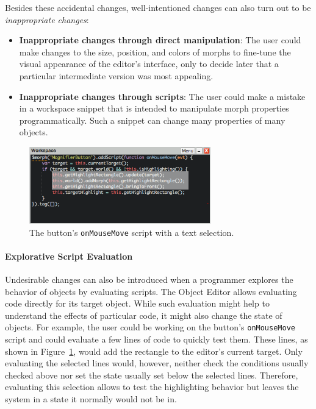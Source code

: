 Besides these accidental changes, well-intentioned changes can also turn out to be \emph{inappropriate changes}:

\begin{itemize}
    \item \textbf{Inappropriate changes through direct manipulation}: The user could make changes to the size, position, and colors of morphs to fine-tune the visual appearance of the editor's interface, only to decide later that a particular intermediate version was most appealing.
    \item \textbf{Inappropriate changes through scripts}: The user could make a mistake in a workspace snippet that is intended to manipulate morph properties programmatically. Such a snippet can change many properties of many objects.
\end{itemize}

\begin{figure}[h]
    \centering
    \includegraphics[width=0.7\textwidth]{figures/3_motivation/4_workspaceDoIt.png}
    \caption{The button's \lstinline{onMouseMove} script with a text selection.}
    \label{fig:onMouseOverScript}
\end{figure}

\paragraph{Explorative Script Evaluation}
Undesirable changes can also be introduced when a programmer explores the behavior of objects by evaluating scripts.
The Object Editor allows evaluating code directly for its target object.
While such evaluation might help to understand the effects of particular code, it might also change the state of objects.
For example, the user could be working on the button's \lstinline{onMouseMove} script and could evaluate a few lines of code to quickly test them.
These lines, as shown in Figure~\ref{fig:onMouseOverScript}, would add the rectangle to the editor's current target.
Only evaluating the selected lines would, however, neither check the conditions usually checked above nor set the state usually set below the selected lines.
Therefore, evaluating this selection allows to test the highlighting behavior but leaves the system in a state it normally would not be in.

